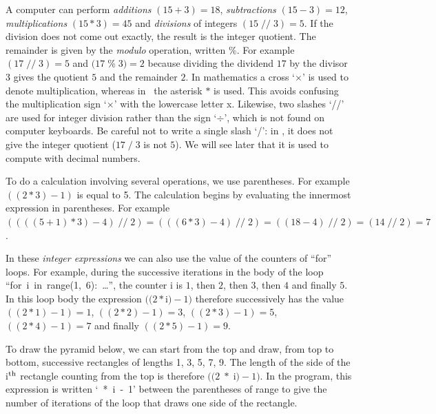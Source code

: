 A computer can perform {\em additions} $(15 + 3) = 18$, {\em subtractions}
$(15 - 3) = 12$,
{\em multiplications} $(15 \ast 3) = 45$ and {\em divisions} of integers $(15 \;/\!/\; 3) = 5$.
If the division does not come out exactly,
the result is the integer quotient. The remainder is given
by the {\em modulo} operation, written {\idt \%}. For example
$(17 \;/\!/\; 3) = 5$ and $(17 \;${\idt \%}$\; 3) = 2$ because dividing the dividend $17$
by the divisor $3$ gives the quotient $5$ and the remainder $2$. In mathematics a cross
`$\times$' is used to denote multiplication, whereas in \python\ the asterisk $\ast$ is used.
This avoids confusing the multiplication sign `$\times$' with the lowercase letter {\idt x}.
Likewise, two slashes `{\idt //}' are used for integer division rather than the sign
`$\div$', which is not found on computer keyboards.
Be careful not to write a single slash `{\idt /}': in \python, it does not give the
integer quotient ($17 \;/\; 3$ is not $5$). We will see later that it is used to compute with
decimal numbers.

To do a calculation involving several operations, we use pa\-ren\-the\-ses. For example
$((2 \ast 3) - 1)$ is equal to 5. The calculation begins by evaluating the innermost
expression in parentheses.
For example $((((5 + 1) \ast 3) - 4) \;/\!/\; 2) = (((6 \ast 3) - 4) \;/\!/\; 2) =
((18 - 4) \;/\!/\; 2) = (14 \;/\!/\; 2) = 7$.

In these {\em integer expressions}
we can also use the value of the counters of ``for'' loops. For example,
during the successive iterations in the body of the loop
``{\mcl for}\ {\idt i}\ {\mcl in}\ {\idt range(1,\ 6):}\ \ldots'',
the counter {\idt i} is $1$, then $2$, then $3$, then $4$ and finally $5$.
In this loop body the expression $((2 \ast ${\idt  i}$) - 1)$ therefore successively has the value
$((2 \ast 1) - 1) = 1$, $((2 \ast 2) - 1) = 3$, $((2 \ast 3) - 1) = 5$, $((2 \ast 4) - 1) = 7$ and finally
$((2 \ast 5) - 1) = 9$.

\begin{exemple}[Pyramid]
To draw the pyramid below, we can start from the top and draw, from
top to bottom, successive rectangles of lengths 1, 3, 5, 7, 9. The length of the
side of the {\idt i}$^{\rm th}$ rectangle counting from the top is
therefore $((2\;\ast\;${\idt  i}$) - 1)$. In the program, this expression is written
`{\ *\ i\ -\ 1}' between the parentheses of {\idt range} to give the number of iterations
of the loop that draws one side of the rectangle.

\pagebreak[3]
\vspace*{22mm}%
%
\vspace*{-22mm}%

\end{exemple}

